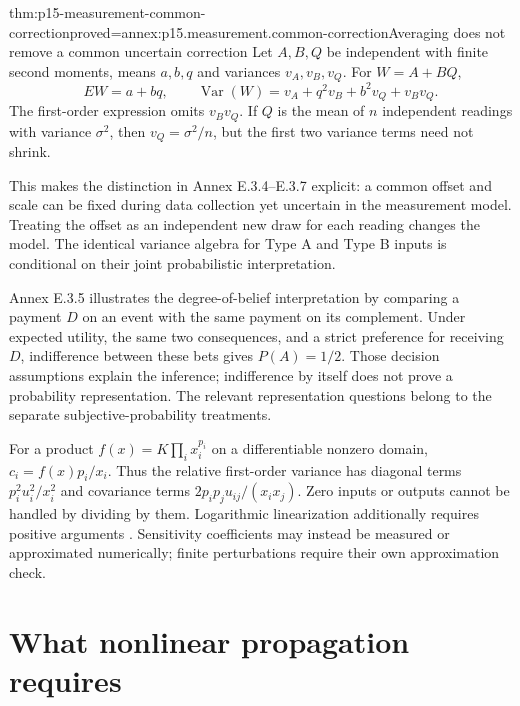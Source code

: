 \begin{hbtheorem}{thm:p15-measurement-common-correction}{proved=annex:p15.measurement.common-correction}{Averaging does not remove a common uncertain correction}
Let \(A,B,Q\) be independent with finite second moments, means \(a,b,q\)
and variances \(v_A,v_B,v_Q\). For \(W=A+BQ\),
\[
 EW=a+bq,\qquad
 \operatorname{Var}(W)=v_A+q^2v_B+b^2v_Q+v_Bv_Q.
\]
The first-order expression omits \(v_Bv_Q\). If \(Q\) is the mean of
\(n\) independent readings with variance \(\sigma^2\), then
\(v_Q=\sigma^2/n\), but the first two variance terms need not shrink.
\end{hbtheorem}

This makes the distinction in Annex E.3.4--E.3.7 explicit: a common offset and
scale can be fixed during data collection yet uncertain in the measurement
model. Treating the offset as an independent new draw for each reading changes
the model. The identical variance algebra for Type A and Type B inputs is
conditional on their joint probabilistic interpretation.

Annex E.3.5 illustrates the degree-of-belief interpretation by comparing a
payment \(D\) on an event with the same payment on its complement. Under
expected utility, the same two consequences, and a strict preference for
receiving \(D\), indifference between these bets gives \(P(A)=1/2\).
Those decision assumptions explain the inference; indifference by itself
does not prove a probability representation. The relevant representation
questions belong to the separate subjective-probability treatments.

For a product \(f(x)=K\prod_i x_i^{p_i}\) on a differentiable nonzero domain,
\(c_i=f(x)p_i/x_i\). Thus the relative first-order variance has diagonal
terms \(p_i^2u_i^2/x_i^2\) and covariance terms
\(2p_i p_j u_{ij}/(x_i x_j)\). Zero inputs or outputs cannot be handled
by dividing by them. Logarithmic linearization additionally requires positive
arguments \cite[5.1.6, 5.2.2]{JCGM1002008EMeasurement}.
Sensitivity coefficients may instead be measured or approximated numerically;
finite perturbations require their own approximation check.

\section{What nonlinear propagation requires}
\label{sec:p15-measurement-nonlinear}

